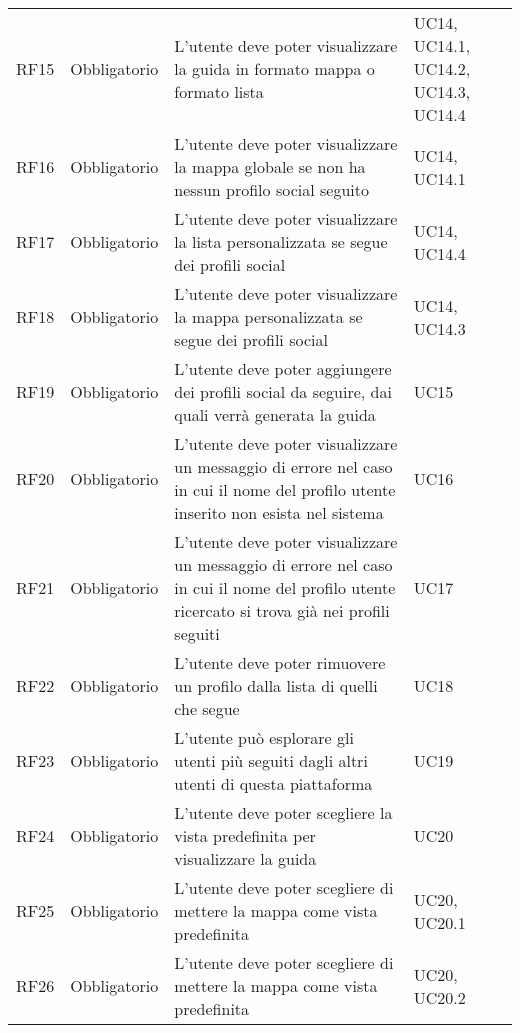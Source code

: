 {\begin{longtable}{C{.257\freewidth} C{.257\freewidth} C{.257\freewidth} C{.257\freewidth}}
      RF15 & Obbligatorio & L'utente deve poter visualizzare la guida in formato mappa o formato lista & UC14, UC14.1, UC14.2, UC14.3, UC14.4 \\
      RF16 & Obbligatorio & L'utente deve poter visualizzare la mappa globale se non ha nessun profilo social seguito & UC14, UC14.1 \\
      RF17 & Obbligatorio & L'utente deve poter visualizzare la lista personalizzata se segue dei profili social & UC14, UC14.4 \\
      RF18 & Obbligatorio & L'utente deve poter visualizzare la mappa personalizzata se segue dei profili social & UC14, UC14.3 \\
      RF19 & Obbligatorio & L'utente deve poter aggiungere dei profili social da seguire, dai quali verrà generata la guida & UC15 \\
      RF20 & Obbligatorio & L'utente deve poter visualizzare un messaggio di errore nel caso in cui il nome del profilo utente inserito non esista nel sistema & UC16 \\
      RF21 & Obbligatorio & L'utente deve poter visualizzare un messaggio di errore nel caso in cui il nome del profilo utente ricercato si trova già nei profili seguiti & UC17 \\
      RF22 & Obbligatorio & L'utente deve poter rimuovere un profilo dalla lista di quelli che segue & UC18 \\
      RF23 & Obbligatorio & L'utente può esplorare gli utenti più seguiti dagli altri utenti di questa piattaforma & UC19 \\
      RF24 & Obbligatorio & L'utente deve poter scegliere la vista predefinita per visualizzare la guida & UC20 \\
      RF25 & Obbligatorio & L'utente deve poter scegliere di mettere la mappa come vista predefinita & UC20, UC20.1 \\
      RF26 & Obbligatorio & L'utente deve poter scegliere di mettere la mappa come vista predefinita & UC20, UC20.2 \\	   
      \bottomrule
      \end{longtable}
}

